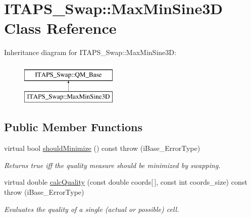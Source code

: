 \hypertarget{class_i_t_a_p_s___swap_1_1_max_min_sine3_d}{
\section{ITAPS\_\-Swap::MaxMinSine3D Class Reference}
\label{class_i_t_a_p_s___swap_1_1_max_min_sine3_d}
}
Inheritance diagram for ITAPS\_\-Swap::MaxMinSine3D:\begin{figure}[H]
\begin{center}
\leavevmode
\includegraphics[height=2cm]{class_i_t_a_p_s___swap_1_1_max_min_sine3_d}
\end{center}
\end{figure}
\subsection*{Public Member Functions}
\begin{DoxyCompactItemize}
\item 
\hypertarget{class_i_t_a_p_s___swap_1_1_max_min_sine3_d_a327f610a8d16c81434b6e0af19640cd1}{
virtual bool \hyperlink{class_i_t_a_p_s___swap_1_1_max_min_sine3_d_a327f610a8d16c81434b6e0af19640cd1}{shouldMinimize} () const   throw (iBase\_\-ErrorType)}
\label{class_i_t_a_p_s___swap_1_1_max_min_sine3_d_a327f610a8d16c81434b6e0af19640cd1}

\begin{DoxyCompactList}\small\item\em Returns true iff the quality measure should be minimized by swapping. \item\end{DoxyCompactList}\item 
virtual double \hyperlink{class_i_t_a_p_s___swap_1_1_max_min_sine3_d_a4856dd6b9712f90d6327f1c651b90471}{calcQuality} (const double coords\mbox{[}$\,$\mbox{]}, const int coords\_\-size) const   throw (iBase\_\-ErrorType)
\begin{DoxyCompactList}\small\item\em Evaluates the quality of a single (actual or possible) cell. \item\end{DoxyCompactList}\end{DoxyCompactItemize}


